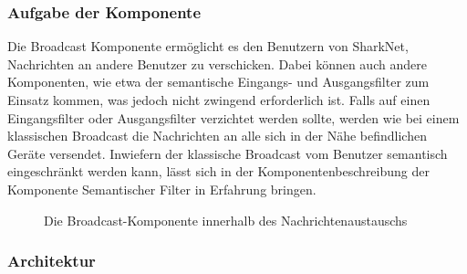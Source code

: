 \subsubsection{Aufgabe der Komponente}
Die Broadcast Komponente ermöglicht es den Benutzern von SharkNet, Nachrichten an andere Benutzer zu verschicken. Dabei können auch andere Komponenten, wie etwa der semantische Eingangs- und Ausgangsfilter zum Einsatz kommen, was jedoch nicht zwingend erforderlich ist. Falls auf einen Eingangsfilter oder Ausgangsfilter verzichtet werden sollte, werden wie bei einem klassischen Broadcast die Nachrichten an alle sich in der Nähe befindlichen Geräte versendet. Inwiefern der klassische Broadcast vom Benutzer semantisch eingeschränkt werden kann, lässt sich in der Komponentenbeschreibung der Komponente Semantischer Filter in Erfahrung bringen.\newline
\begin{figure}[H]
	\centering
	\caption{Die Broadcast-Komponente innerhalb des Nachrichtenaustauschs}
	\label{fig:broadcastComp}
\end{figure}
\newpage
\subsubsection{Architektur}

